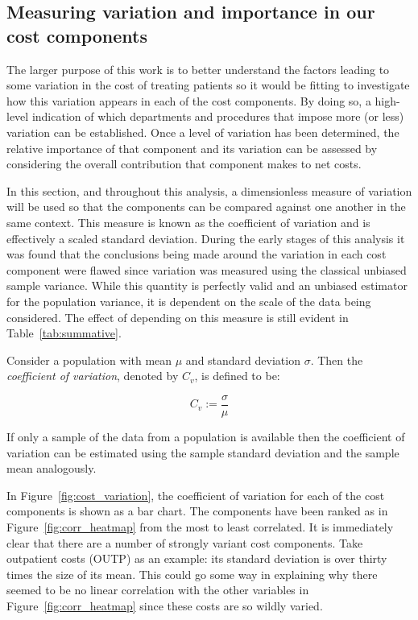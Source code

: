 \subsection{Measuring variation and importance in our cost components}

The larger purpose of this work is to better understand the factors leading to
some variation in the cost of treating patients so it would be fitting to
investigate how this variation appears in each of the cost components. By doing
so, a high-level indication of which departments and procedures that impose more
(or less) variation can be established. Once a level of variation has been
determined, the relative importance of that component and its variation can be
assessed by considering the overall contribution that component makes to net
costs.

In this section, and throughout this analysis, a dimensionless measure of
variation will be used so that the components can be compared against one
another in the same context. This measure is known as the coefficient of
variation and is effectively a scaled standard deviation. During the early
stages of this analysis it was found that the conclusions being made around the
variation in each cost component were flawed since variation was measured using
the classical unbiased sample variance. While this quantity is perfectly valid
and an unbiased estimator for the population variance, it is dependent on the
scale of the data being considered. The effect of depending on this measure is
still evident in Table~\ref{tab:summative}.

\begin{definition}
    Consider a population with mean \(\mu\) and standard deviation \(\sigma\).
    Then the \emph{coefficient of variation}, denoted by \(C_v\), is defined to
    be:

    \[
        C_{v} := \frac{\sigma}{\mu}
    \]

    If only a sample of the data from a population is available then the
    coefficient of variation can be estimated using the sample standard
    deviation and the sample mean analogously.
\end{definition}

In Figure~\ref{fig:cost_variation}, the coefficient of variation for each of the
cost components is shown as a bar chart. The components have been ranked as in
Figure~\ref{fig:corr_heatmap} from the most to least correlated. It is
immediately clear that there are a number of strongly variant cost components.
Take outpatient costs (OUTP) as an example: its standard deviation is over
thirty times the size of its mean. This could go some way in explaining why
there seemed to be no linear correlation with the other variables in
Figure~\ref{fig:corr_heatmap} since these costs are so wildly varied.

